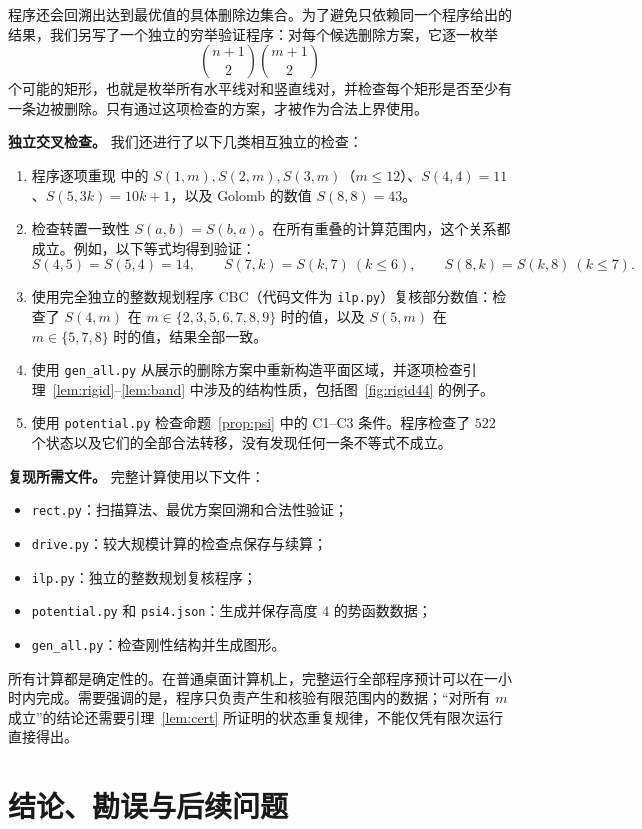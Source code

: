 \documentclass[11pt]{ctexart}
\theoremstyle{definition}
\begin{document}
程序还会回溯出达到最优值的具体删除边集合。为了避免只依赖同一个程序给出的结果，我们另写了一个独立的穷举验证程序：对每个候选删除方案，它逐一枚举
\[
\binom{n+1}{2}\binom{m+1}{2}
\]
个可能的矩形，也就是枚举所有水平线对和竖直线对，并检查每个矩形是否至少有一条边被删除。只有通过这项检查的方案，才被作为合法上界使用。

\textbf{独立交叉检查。}
我们还进行了以下几类相互独立的检查：

\begin{enumerate}
\item 程序逐项重现 \cite{NT25} 中的 $S(1,m),S(2,m),S(3,m)$（$m\le12$）、$S(4,4)=11$、$S(5,3k)=10k+1$，以及 Golomb 的数值 $S(8,8)=43$。
\item 检查转置一致性 $S(a,b)=S(b,a)$。在所有重叠的计算范围内，这个关系都成立。例如，以下等式均得到验证：
\[
S(4,5)=S(5,4)=14,\qquad
S(7,k)=S(k,7)\ (k\le6),\qquad
S(8,k)=S(k,8)\ (k\le7).
\]
\item 使用完全独立的整数规划程序 CBC（代码文件为 \texttt{ilp.py}）复核部分数值：检查了 $S(4,m)$ 在
$m\in\{2,3,5,6,7,8,9\}$ 时的值，以及 $S(5,m)$ 在
$m\in\{5,7,8\}$ 时的值，结果全部一致。
\item 使用 \texttt{gen\_all.py} 从展示的删除方案中重新构造平面区域，并逐项检查引理~\ref{lem:rigid}--\ref{lem:band} 中涉及的结构性质，包括图~\ref{fig:rigid44} 的例子。
\item 使用 \texttt{potential.py} 检查命题~\ref{prop:psi} 中的 C1--C3 条件。程序检查了 $522$ 个状态以及它们的全部合法转移，没有发现任何一条不等式不成立。
\end{enumerate}

\textbf{复现所需文件。}
完整计算使用以下文件：
\begin{itemize}
\item \texttt{rect.py}：扫描算法、最优方案回溯和合法性验证；
\item \texttt{drive.py}：较大规模计算的检查点保存与续算；
\item \texttt{ilp.py}：独立的整数规划复核程序；
\item \texttt{potential.py} 和 \texttt{psi4.json}：生成并保存高度 $4$ 的势函数数据；
\item \texttt{gen\_all.py}：检查刚性结构并生成图形。
\end{itemize}
所有计算都是确定性的。在普通桌面计算机上，完整运行全部程序预计可以在一小时内完成。需要强调的是，程序只负责产生和核验有限范围内的数据；“对所有 $m$ 成立”的结论还需要引理~\ref{lem:cert} 所证明的状态重复规律，不能仅凭有限次运行直接得出。

\section{结论、勘误与后续问题}\label{sec:open}
\end{document}
